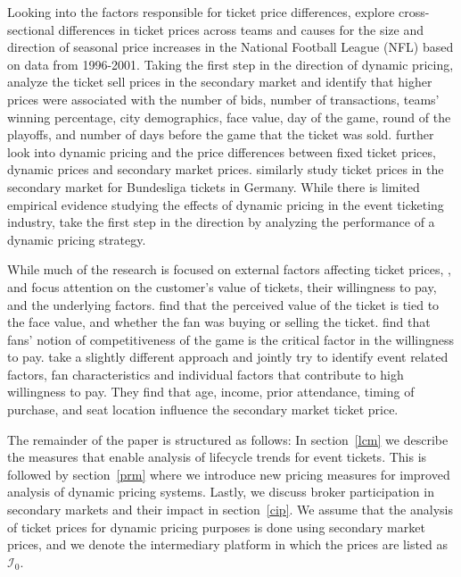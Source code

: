 \documentclass[letterpaper, 12pt]{article}
\begin{document}
Looking into the factors responsible for ticket price differences, \cite{rishe2003ticket} explore cross-sectional differences in ticket prices across teams and causes for the size and direction of seasonal price increases in the National Football League (NFL) based on data from 1996-2001. Taking the first step in the direction of dynamic pricing, \cite{drayer2009value} analyze the ticket sell prices in the secondary market and identify that higher prices were associated with the number of bids, number of transactions, teams' winning percentage, city demographics, face value, day of the game, round of the playoffs, and number of days before the game that the ticket was sold. \cite{shapiro2012new} further look into dynamic pricing and the price differences between fixed ticket prices, dynamic prices and secondary market prices. \cite{kemper2015factors} similarly study ticket prices in the secondary market for Bundesliga tickets in Germany. While there is limited empirical evidence studying the effects of dynamic pricing in the event ticketing industry, \cite{xu2017designing} take the first step in the direction by analyzing the performance of a dynamic pricing strategy. 

While much of the research is focused on external factors affecting ticket prices, \cite{drayer2011examination}, \cite{nalbantis2017fans} and \cite{popp2018factors} focus attention on the customer's value of tickets, their willingness to pay, and the underlying factors.  \cite{drayer2011examination} find that the perceived value of the ticket is tied to the face value, and whether the fan was buying or selling the ticket. \cite{nalbantis2017fans} find that fans' notion of competitiveness of the game is the critical factor in the willingness to pay. \cite{popp2018factors} take a slightly different approach and jointly try to identify event related factors, fan characteristics and individual factors that contribute to high willingness to pay. They find that age, income, prior attendance, timing of purchase, and seat location influence the secondary market ticket price.

The remainder of the paper is structured as follows: In section~\ref{lcm} we describe the measures that enable analysis of lifecycle trends for event tickets. This is followed by section~\ref{prm} where we introduce new pricing measures for improved analysis of dynamic pricing systems. Lastly, we discuss broker participation in secondary markets and their impact in section~\ref{cip}. We assume that the analysis of ticket prices for dynamic pricing purposes is done using secondary market prices, and we denote the intermediary platform in which the prices are listed as $\mathcal{I}_0$. 
\end{document}
